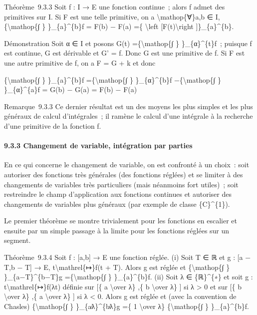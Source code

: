 \documentclass[]{article}
\begin{document}
Théorème~9.3.3 Soit f : I → E une fonction continue~; alors f admet des
primitives sur I. Si F est une telle primitive, on a
\textbackslash{}mathop\{∀\}a,b ∈ I, \{\textbackslash{}mathop\{∫ \}
\}\_\{a\}\^{}\{b\}f = F(b) − F(a) =\{ \textbackslash{}left
{[}F(t)\textbackslash{}right {]}\}\_\{a\}\^{}\{b\}.

Démonstration Soit α ∈ I et posons G(t) =\{\textbackslash{}mathop\{∫ \}
\}\_\{α\}\^{}\{t\}f~; puisque f est continue, G est dérivable et G' = f.
Donc G est une primitive de f. Si F est une autre primitive de f, on a F
= G + k et donc

\{\textbackslash{}mathop\{∫ \} \}\_\{a\}\^{}\{b\}f
=\{\textbackslash{}mathop\{∫ \} \}\_\{α\}\^{}\{b\}f
−\{\textbackslash{}mathop\{∫ \} \}\_\{α\}\^{}\{a\}f = G(b) − G(a) = F(b)
− F(a)

Remarque~9.3.3 Ce dernier résultat est un des moyens les plus simples et
les plus généraux de calcul d'intégrales~; il ramène le calcul d'une
intégrale à la recherche d'une primitive de la fonction f.

\paragraph{9.3.3 Changement de variable, intégration par parties}

En ce qui concerne le changement de variable, on est confronté à un
choix~: soit autoriser des fonctions très générales (des fonctions
réglées) et se limiter à des changements de variables très particuliers
(mais néanmoins fort utiles)~; soit restreindre le champ d'application
aux fonctions continues et autoriser des changements de variables plus
généraux (par exemple de classe \{C\}\^{}\{1\}).

Le premier théorème se montre trivialement pour les fonctions en
escalier et ensuite par un simple passage à la limite pour les fonctions
réglées sur un segment.

Théorème~9.3.4 Soit f : {[}a,b{]} → E une fonction réglée. (i) Soit T ∈
ℝ et g : {[}a − T,b − T{]} → E, t\textbackslash{}mathrel\{↦\}f(t + T).
Alors g est réglée et \{\textbackslash{}mathop\{∫ \}
\}\_\{a−T\}\^{}\{b−T\}g =\{\textbackslash{}mathop\{∫ \}
\}\_\{a\}\^{}\{b\}f. (ii) Soit λ ∈ \{ℝ\}\^{}\{∗\} et soit g :
t\textbackslash{}mathrel\{↦\}f(λt) définie sur {[}\{ a
\textbackslash{}over λ\} ,\{ b \textbackslash{}over λ\} {]} si λ
\textgreater{} 0 et sur {[}\{ b \textbackslash{}over λ\} ,\{ a
\textbackslash{}over λ\} {]} si λ \textless{} 0. Alors g est réglée et
(avec la convention de Chasles) \{\textbackslash{}mathop\{∫ \}
\}\_\{a∕λ\}\^{}\{b∕λ\}g =\{ 1 \textbackslash{}over λ\}
\{\textbackslash{}mathop\{∫ \} \}\_\{a\}\^{}\{b\}f.
\end{document}
